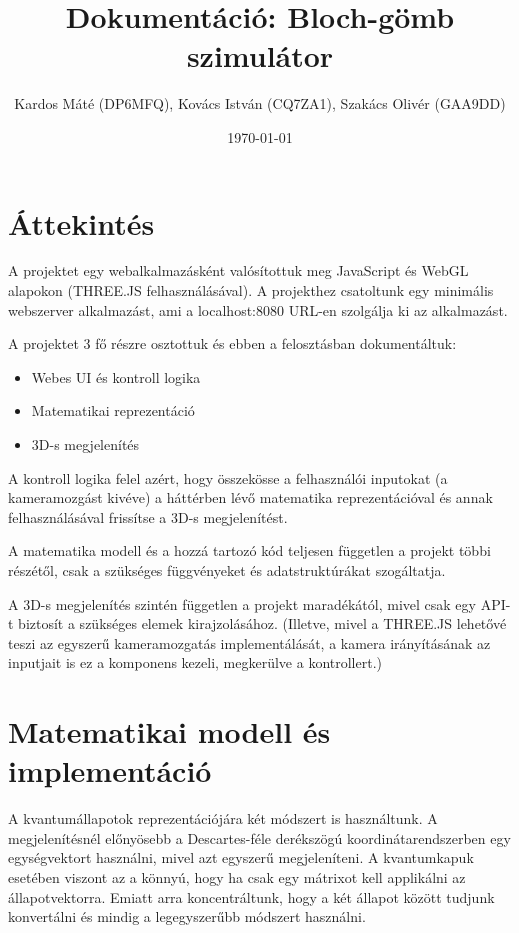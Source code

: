\documentclass[12pt]{article}
\title{Dokumentáció: Bloch-gömb szimulátor}
\author{Kardos Máté (DP6MFQ), Kovács István (CQ7ZA1), Szakács Olivér (GAA9DD)}
\date{\today}
\begin{document}
	
	\maketitle
	
	\section{Áttekintés}
    A projektet egy webalkalmazásként valósítottuk meg JavaScript és WebGL alapokon (THREE.JS felhasználásával). A projekthez csatoltunk egy minimális webszerver alkalmazást, ami a localhost:8080 URL-en szolgálja ki az alkalmazást.


    A projektet 3 fő részre osztottuk és ebben a felosztásban dokumentáltuk:
    \begin{itemize}
        \item Webes UI és kontroll logika
        \item Matematikai reprezentáció
        \item 3D-s megjelenítés
    \end{itemize}

    A kontroll logika felel azért, hogy összekösse a felhasználói inputokat (a kameramozgást kivéve) a háttérben lévő matematika reprezentációval és annak felhasználásával frissítse a 3D-s megjelenítést.

    A matematika modell és a hozzá tartozó kód teljesen független a projekt többi részétől, csak a szükséges függvényeket és adatstruktúrákat szogáltatja.

    A 3D-s megjelenítés szintén független a projekt maradékától, mivel csak egy API-t biztosít a szükséges elemek kirajzolásához. (Illetve, mivel a THREE.JS lehetővé teszi az egyszerű kameramozgatás implementálását, a kamera irányításának az inputjait is ez a komponens kezeli, megkerülve a kontrollert.)
	
	\section{Matematikai modell és implementáció}

    A kvantumállapotok reprezentációjára két módszert is használtunk. A megjelenítésnél előnyösebb a Descartes-féle derékszögú koordinátarendszerben egy egységvektort használni, mivel azt egyszerű megjeleníteni. A kvantumkapuk esetében viszont az a könnyú, hogy ha csak egy mátrixot kell applikálni az állapotvektorra. Emiatt arra koncentráltunk, hogy a két állapot között tudjunk konvertálni és mindig a legegyszerűbb módszert használni.
	
\end{document}
